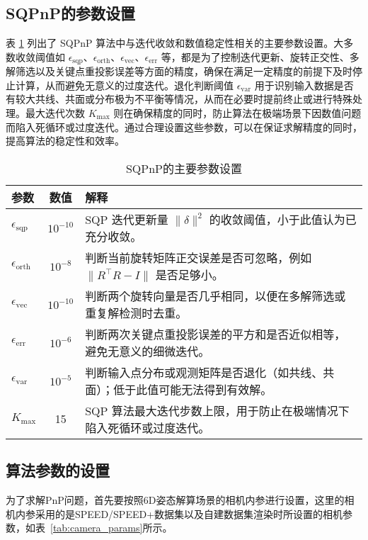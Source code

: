 \subsection{SQPnP的参数设置}
表 \ref{tab:sqpnp-params} 列出了 SQPnP 算法中与迭代收敛和数值稳定性相关的主要参数设置。大多数收敛阈值如 \(\epsilon_{\mathrm{sqp}}\)、\(\epsilon_{\mathrm{orth}}\)、\(\epsilon_{\mathrm{vec}}\)、\(\epsilon_{\mathrm{err}}\) 等，都是为了控制迭代更新、旋转正交性、多解筛选以及关键点重投影误差等方面的精度，确保在满足一定精度的前提下及时停止计算，从而避免无意义的过度迭代。退化判断阈值 \(\epsilon_{\mathrm{var}}\) 用于识别输入数据是否有较大共线、共面或分布极为不平衡等情况，从而在必要时提前终止或进行特殊处理。最大迭代次数 \(K_{\mathrm{max}}\) 则在确保精度的同时，防止算法在极端场景下因数值问题而陷入死循环或过度迭代。通过合理设置这些参数，可以在保证求解精度的同时，提高算法的稳定性和效率。
\begin{table}[htbp]
	\centering
	\caption{SQPnP的主要参数设置}
	\label{tab:sqpnp-params}
	\begin{tabular}{l c p{7.5cm}}
		\toprule
		参数 & 数值 & 解释 \\
		\midrule
		
		$\epsilon_{\mathrm{sqp}}$      & $10^{-10}$ & 
		SQP 迭代更新量 $\|\delta\|^2$ 的收敛阈值，小于此值认为已充分收敛。\\[3pt]
		
		$\epsilon_{\mathrm{orth}}$     & $10^{-8}$  & 
		判断当前旋转矩阵正交误差是否可忽略，例如 $\|R^\top R - I\|$ 是否足够小。\\[3pt]
		
		$\epsilon_{\mathrm{vec}}$      & $10^{-10}$ &
		判断两个旋转向量是否几乎相同，以便在多解筛选或重复解检测时去重。\\[3pt]
		
		$\epsilon_{\mathrm{err}}$      & $10^{-6}$  &
		判断两次关键点重投影误差的平方和是否近似相等，避免无意义的细微迭代。\\[3pt]
		
		$\epsilon_{\mathrm{var}}$      & $10^{-5}$  &
		判断输入点分布或观测矩阵是否退化（如共线、共面）；低于此值可能无法得到有效解。\\[3pt]
		
		$K_{\mathrm{max}}$             & 15         &
		SQP 算法最大迭代步数上限，用于防止在极端情况下陷入死循环或过度迭代。\\
		\bottomrule
	\end{tabular}
\end{table}


\subsection{算法参数的设置}
为了求解PnP问题，首先要按照6D姿态解算场景的相机内参进行设置，这里的相机内参采用的是SPEED/SPEED+数据集以及自建数据集渲染时所设置的相机参数，如表~\ref{tab:camera_params}所示。

